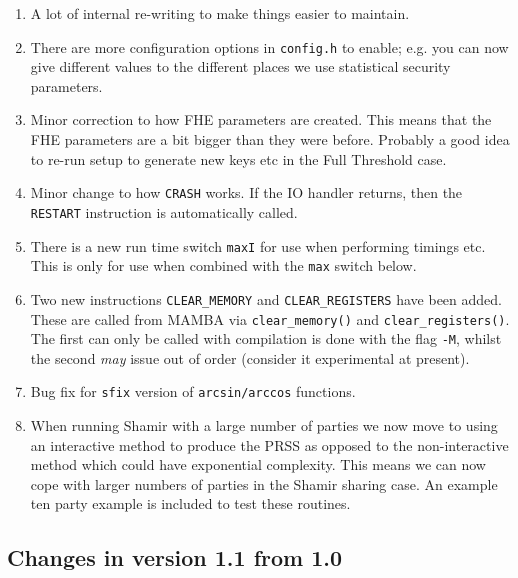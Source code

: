 \begin{enumerate}
\item A lot of internal re-writing to make things easier to maintain.
\item There are more configuration options in \verb+config.h+ to enable;
      e.g. you can now give different values to the different places
      we use statistical security parameters.
\item Minor correction to how FHE parameters are created. This means
      that the FHE parameters are a bit bigger than they were before.
      Probably a good idea to re-run setup to generate new keys etc
      in the Full Threshold case.
\item Minor change to how \verb+CRASH+ works. If the IO handler returns, 
      then the \verb+RESTART+ instruction is automatically called.
\item There is a new run time switch \verb+maxI+ for use when performing
      timings etc. This is only for use when combined with the \verb+max+
      switch below.
\item Two new instructions \verb+CLEAR_MEMORY+ and \verb+CLEAR_REGISTERS+
      have been added. 
      These are called from MAMBA via \verb+clear_memory()+ and \verb+clear_registers()+.
      The first can only be called with compilation is done with the flag \verb+-M+, whilst
      the second {\em may} issue out of order (consider it experimental at present).
\item Bug fix for \verb+sfix+ version of \verb+arcsin/arccos+ functions.
\item When running Shamir with a large number of parties we now move to using
      an interactive method to produce the PRSS as opposed to the non-interactive
      method which could have exponential complexity. This means we can now cope
      with larger numbers of parties in the Shamir sharing case. An example
      ten party example is included to test these routines.
\end{enumerate}


\subsection{Changes in version 1.1 from 1.0}

